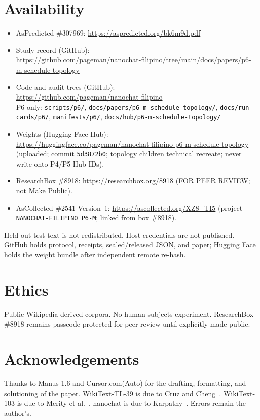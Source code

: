 \documentclass[11pt,a4paper]{article}
\begin{document}
\section*{Availability}
\begin{itemize}[leftmargin=1.6em,itemsep=0.35em]
\item AsPredicted \#307969: \url{https://aspredicted.org/bk6m9d.pdf}
\item Study record (GitHub):\\
\url{https://github.com/pageman/nanochat-filipino/tree/main/docs/papers/p6-m-schedule-topology}
\item Code and audit trees (GitHub):\\
\url{https://github.com/pageman/nanochat-filipino}\\
P6-only: \texttt{scripts/p6/}, \texttt{docs/papers/p6-m-schedule-topology/},
\texttt{docs/run-cards/p6/}, \texttt{manifests/p6/},
\texttt{docs/hub/p6-m-schedule-topology/}
\item Weights (Hugging Face Hub):\\
\url{https://huggingface.co/pageman/nanochat-filipino-p6-m-schedule-topology}\\
(uploaded; commit \texttt{5d3872b0}; topology children technical recreate; never write onto P4/P5 Hub IDs).
\item ResearchBox \#8918: \url{https://researchbox.org/8918} (FOR PEER REVIEW; not Make Public).
\item AsCollected \#2541 Version~1: \url{https://ascollected.org/XZ8_TI5} (project \texttt{NANOCHAT-FILIPINO P6-M}; linked from box \#8918).
\end{itemize}
Held-out test text is not redistributed. Host credentials are not published. GitHub holds protocol, receipts, sealed/released JSON, and paper; Hugging Face holds the weight bundle after independent remote re-hash.

\section*{Ethics}
Public Wikipedia-derived corpora. No human-subjects experiment. ResearchBox \#8918 remains passcode-protected for peer review until explicitly made public.

\section*{Acknowledgements}
Thanks to Manus 1.6 and Cursor.com(Auto) for the drafting, formatting, and solutioning of the paper. WikiText-TL-39 is due to Cruz and Cheng~\cite{cruz2019eval}. WikiText-103 is due to Merity et al.~\cite{merity2017pointer}. nanochat is due to Karpathy~\cite{karpathy2026nanochat}. Errors remain the author's.
\end{document}
